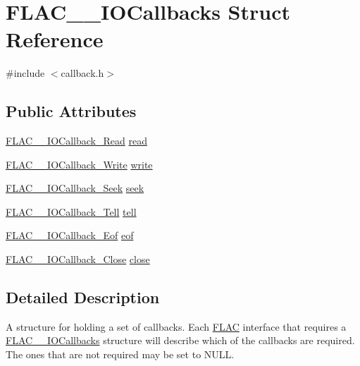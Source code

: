 \hypertarget{struct_f_l_a_c_____i_o_callbacks}{}\section{F\+L\+A\+C\+\_\+\+\_\+\+I\+O\+Callbacks Struct Reference}
\label{struct_f_l_a_c_____i_o_callbacks}


{\ttfamily \#include $<$callback.\+h$>$}

\subsection*{Public Attributes}
\begin{DoxyCompactItemize}
\item 
\hyperlink{group__flac__callbacks_ga49d95218a6c09b215cd92cc96de71bf9}{F\+L\+A\+C\+\_\+\+\_\+\+I\+O\+Callback\+\_\+\+Read} \hyperlink{struct_f_l_a_c_____i_o_callbacks_a6dd767bc254e31dc47c9a0d218e72190}{read}
\item 
\hyperlink{group__flac__callbacks_gad991792235879aecae289b56a112e1b8}{F\+L\+A\+C\+\_\+\+\_\+\+I\+O\+Callback\+\_\+\+Write} \hyperlink{struct_f_l_a_c_____i_o_callbacks_ad64901e5a5710ee4c3c157c75d51ddc0}{write}
\item 
\hyperlink{group__flac__callbacks_gab3942bbbd6ae09bcefe7cb3a0060c49c}{F\+L\+A\+C\+\_\+\+\_\+\+I\+O\+Callback\+\_\+\+Seek} \hyperlink{struct_f_l_a_c_____i_o_callbacks_aa1a6f4623965a2d9fcc09b92fabaa1ee}{seek}
\item 
\hyperlink{group__flac__callbacks_ga45314930cabc2e9c04867eae6bca309f}{F\+L\+A\+C\+\_\+\+\_\+\+I\+O\+Callback\+\_\+\+Tell} \hyperlink{struct_f_l_a_c_____i_o_callbacks_a8ff0d175a7b3e9318270e305918df827}{tell}
\item 
\hyperlink{group__flac__callbacks_ga00ae3b3d373e691908e9539ebf720675}{F\+L\+A\+C\+\_\+\+\_\+\+I\+O\+Callback\+\_\+\+Eof} \hyperlink{struct_f_l_a_c_____i_o_callbacks_a4810838b77667dc02415c854b2103e66}{eof}
\item 
\hyperlink{group__flac__callbacks_ga0032267fac38220689778833e08f7387}{F\+L\+A\+C\+\_\+\+\_\+\+I\+O\+Callback\+\_\+\+Close} \hyperlink{struct_f_l_a_c_____i_o_callbacks_a8e447ae1999d9da9ebad5417f47223be}{close}
\end{DoxyCompactItemize}


\subsection{Detailed Description}
A structure for holding a set of callbacks. Each \hyperlink{namespace_f_l_a_c}{F\+L\+AC} interface that requires a \hyperlink{struct_f_l_a_c_____i_o_callbacks}{F\+L\+A\+C\+\_\+\+\_\+\+I\+O\+Callbacks} structure will describe which of the callbacks are required. The ones that are not required may be set to N\+U\+LL.

